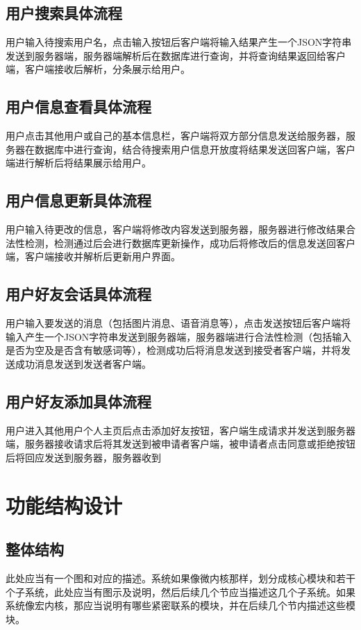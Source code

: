 \subsection{用户搜索具体流程}
用户输入待搜索用户名，点击输入按钮后客户端将输入结果产生一个JSON字符串发送到服务器端，服务器端解析后在数据库进行查询，并将查询结果返回给客户端，客户端接收后解析，分条展示给用户。

\subsection{用户信息查看具体流程}
用户点击其他用户或自己的基本信息栏，客户端将双方部分信息发送给服务器，服务器在数据库中进行查询，结合待搜索用户信息开放度将结果发送回客户端，客户端进行解析后将结果展示给用户。

\subsection{用户信息更新具体流程}
用户输入待更改的信息，客户端将修改内容发送到服务器，服务器进行修改结果合法性检测，检测通过后会进行数据库更新操作，成功后将修改后的信息发送回客户端，客户端接收并解析后更新用户界面。

\subsection{用户好友会话具体流程}
用户输入要发送的消息（包括图片消息、语音消息等），点击发送按钮后客户端将输入产生一个JSON字符串发送到服务器端，服务器端进行合法性检测（包括输入是否为空及是否含有敏感词等），检测成功后将消息发送到接受者客户端，并将发送成功消息发送到发送者客户端。

\subsection{用户好友添加具体流程}
用户进入其他用户个人主页后点击添加好友按钮，客户端生成请求并发送到服务器端，服务器接收请求后将其发送到被申请者客户端，被申请者点击同意或拒绝按钮后将回应发送到服务器，服务器收到

\section{功能结构设计}
\subsection{整体结构}
此处应当有一个图和对应的描述。系统如果像微内核那样，划分成核心模块和若干个子系统，此处应当有图示及说明，然后后续几个节应当描述这几个子系统。如果系统像宏内核，那应当说明有哪些紧密联系的模块，并在后续几个节内描述这些模块。

